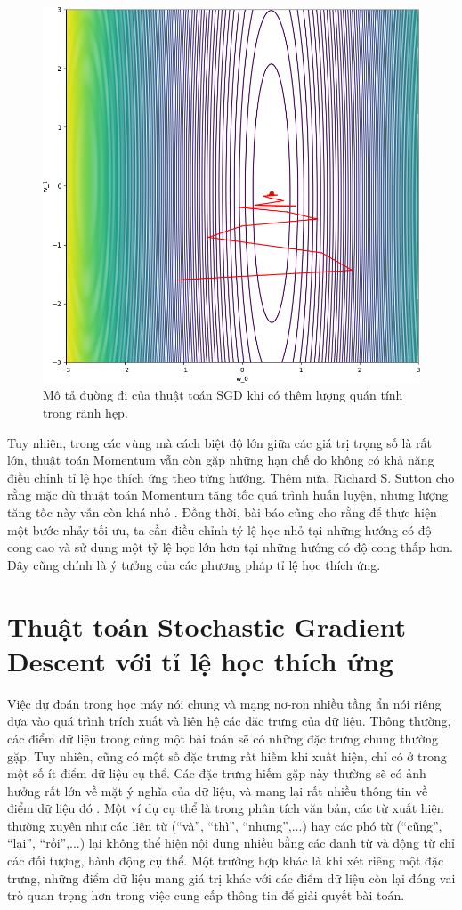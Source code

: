\begin{figure}[htp]
	\centering
	\includegraphics[width=85 mm]{images/sgdm.png}
	\caption{Mô tả đường đi của thuật toán SGD khi có thêm lượng quán tính trong rãnh hẹp.}
	\label{fig:sgd-m}
\end{figure}

Tuy nhiên, trong các vùng mà cách biệt độ lớn giữa các giá trị trọng số là rất lớn, thuật toán Momentum vẫn còn gặp những hạn chế do không có khả năng điều chỉnh tỉ lệ học thích ứng theo từng hướng. Thêm nữa, Richard S. Sutton cho rằng mặc dù thuật toán Momentum tăng tốc quá trình huấn luyện, nhưng lượng tăng tốc này vẫn còn khá nhỏ \cite{sutton1986two}. Đồng thời, bài báo cũng cho rằng để thực hiện một bước nhảy tối ưu, ta cần điều chỉnh tỷ lệ học nhỏ tại những hướng có độ cong cao và sử dụng một tỷ lệ học lớn hơn tại những hướng có độ cong thấp hơn. Đây cũng chính là ý tưởng của các phương pháp tỉ lệ học thích ứng.

\section{Thuật toán Stochastic Gradient Descent với tỉ lệ học thích ứng}

Việc dự đoán trong học máy nói chung và mạng nơ-ron nhiều tầng ẩn nói riêng dựa vào quá trình trích xuất và liên hệ các đặc trưng của dữ liệu. Thông thường, các điểm dữ liệu trong cùng một bài toán sẽ có những đặc trưng chung thường gặp. Tuy nhiên, cũng có một số đặc trưng rất hiếm khi xuất hiện, chỉ có ở trong một số ít điểm dữ liệu cụ thể. Các đặc trưng hiếm gặp này thường sẽ có ảnh hưởng rất lớn về mặt ý nghĩa của dữ liệu, và mang lại rất nhiều thông tin về điểm dữ liệu đó \cite{salton1988term}. Một ví dụ cụ thể là trong phân tích văn bản, các từ xuất hiện thường xuyên như các liên từ (``và'', ``thì'', ``nhưng'',...) hay các phó từ (``cũng'', ``lại'', ``rồi'',...) lại không thể hiện nội dung nhiều bằng các danh từ và động từ chỉ các đối tượng, hành động cụ thể. Một trường hợp khác là khi xét riêng một đặc trưng, những điểm dữ liệu mang giá trị khác với các điểm dữ liệu còn lại đóng vai trò quan trọng hơn trong việc cung cấp thông tin để giải quyết bài toán.

